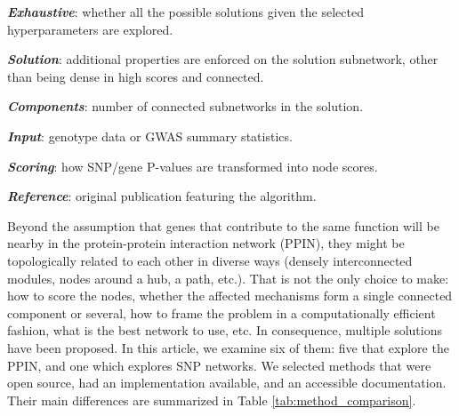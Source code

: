 \documentclass[twocolumn, 10pt]{article}
\begin{document}
\begin{table}[htbp]
\begin{threeparttable}
\begin{tablenotes}
      \item \textbf{\emph{Exhaustive}}: whether all the possible solutions given the selected hyperparameters are explored.\\
      \item \textbf{\emph{Solution}}: additional properties are enforced on the solution subnetwork, other than being dense in high scores and connected.\\
      \item \textbf{\emph{Components}}: number of connected subnetworks in the solution.\\
      \item \textbf{\emph{Input}}: genotype data or GWAS summary statistics.\\
      \item \textbf{\emph{Scoring}}: how SNP/gene P-values are transformed into node scores.\\
      \item \textbf{\emph{Reference}}: original publication featuring the algorithm.
    \end{tablenotes}
  \end{threeparttable}
\end{table}

Beyond the assumption that genes that contribute to the same function will be nearby in the protein-protein interaction network (PPIN), they might be topologically related to each other in diverse ways (densely interconnected modules, nodes around a hub, a path, etc.). That is not the only choice to make: how to score the nodes, whether the affected mechanisms form a single connected component or several, how to frame the problem in a computationally efficient fashion, what is the best network to use, etc. In consequence, multiple solutions have been proposed. In this article, we examine six of them: five that explore the PPIN, and one which explores SNP networks. We selected methods that were open source, had an implementation available, and an accessible documentation. Their main differences are summarized in Table \ref{tab:method_comparison}.
\end{document}
